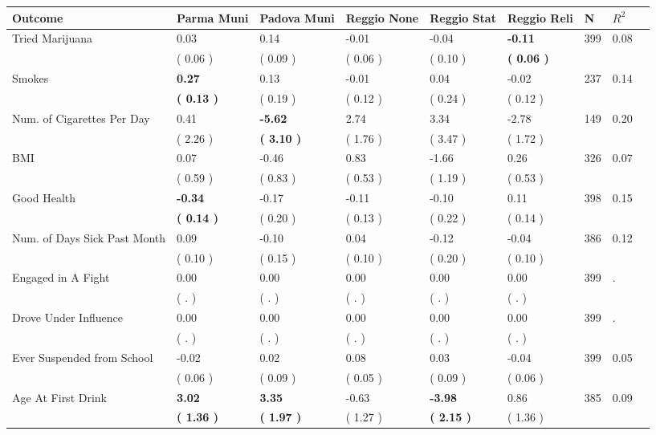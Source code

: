 \begin{tabular}{L{6.2cm} C{1.8cm} C{1.8cm} C{1.8cm} C{1.8cm} C{1.8cm} C{1.8cm} C{0.3cm} C{0.3cm}}
\toprule
 \textbf{Outcome} & \textbf{Parma Muni} & \textbf{Padova Muni} & \textbf{Reggio None} & \textbf{Reggio Stat} & \textbf{Reggio Reli} & \textbf{N} & \textbf{$ R^2$} \\
\midrule
Tried Marijuana &      0.03 &      0.14 &     -0.01 &     -0.04 & \textbf{    -0.11}  & 399 &       0.08 \\ 
 & (     0.06 ) & (     0.09 ) & (     0.06 ) & (     0.10 ) & \textbf{(     0.06 )}  & \\
Smokes & \textbf{     0.27} &      0.13 &     -0.01 &      0.04 &     -0.02  & 237 &       0.14 \\ 
 & \textbf{(     0.13 )} & (     0.19 ) & (     0.12 ) & (     0.24 ) & (     0.12 )  & \\
Num. of Cigarettes Per Day &      0.41 & \textbf{    -5.62} &      2.74 &      3.34 &     -2.78  & 149 &       0.20 \\ 
 & (     2.26 ) & \textbf{(     3.10 )} & (     1.76 ) & (     3.47 ) & (     1.72 )  & \\
BMI &      0.07 &     -0.46 &      0.83 &     -1.66 &      0.26  & 326 &       0.07 \\ 
 & (     0.59 ) & (     0.83 ) & (     0.53 ) & (     1.19 ) & (     0.53 )  & \\
Good Health & \textbf{    -0.34} &     -0.17 &     -0.11 &     -0.10 &      0.11  & 398 &       0.15 \\ 
 & \textbf{(     0.14 )} & (     0.20 ) & (     0.13 ) & (     0.22 ) & (     0.14 )  & \\
Num. of Days Sick Past Month &      0.09 &     -0.10 &      0.04 &     -0.12 &     -0.04  & 386 &       0.12 \\ 
 & (     0.10 ) & (     0.15 ) & (     0.10 ) & (     0.20 ) & (     0.10 )  & \\
Engaged in A Fight &      0.00 &      0.00 &      0.00 &      0.00 &      0.00  & 399 &          . \\ 
 & (        . ) & (        . ) & (        . ) & (        . ) & (        . )  & \\
Drove Under Influence &      0.00 &      0.00 &      0.00 &      0.00 &      0.00  & 399 &          . \\ 
 & (        . ) & (        . ) & (        . ) & (        . ) & (        . )  & \\
Ever Suspended from School &     -0.02 &      0.02 &      0.08 &      0.03 &     -0.04  & 399 &       0.05 \\ 
 & (     0.06 ) & (     0.09 ) & (     0.05 ) & (     0.09 ) & (     0.06 )  & \\
Age At First Drink & \textbf{     3.02} & \textbf{     3.35} &     -0.63 & \textbf{    -3.98} &      0.86  & 385 &       0.09 \\ 
 & \textbf{(     1.36 )} & \textbf{(     1.97 )} & (     1.27 ) & \textbf{(     2.15 )} & (     1.36 )  & \\
\bottomrule
\end{tabular}
